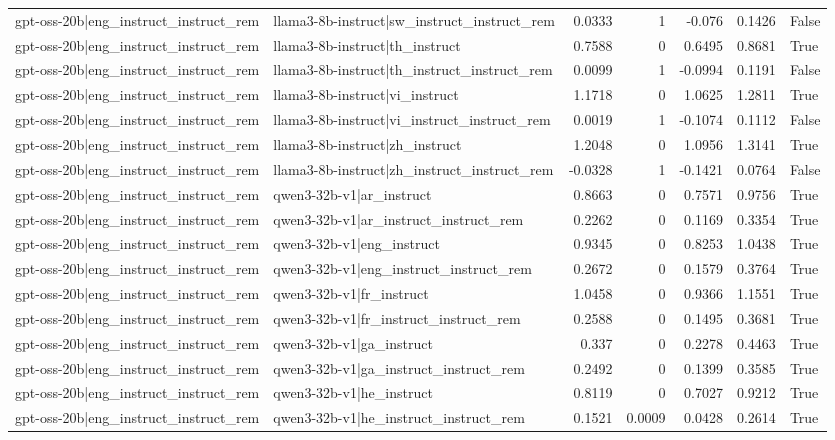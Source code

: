 \begin{table}
\begin{tabular}{l l r r r r l}
gpt-oss-20b|eng_instruct_instruct_rem & llama3-8b-instruct|sw_instruct_instruct_rem & 0.0333 & 1 & -0.076 & 0.1426 & False \\
gpt-oss-20b|eng_instruct_instruct_rem & llama3-8b-instruct|th_instruct & 0.7588 & 0 & 0.6495 & 0.8681 & True \\
gpt-oss-20b|eng_instruct_instruct_rem & llama3-8b-instruct|th_instruct_instruct_rem & 0.0099 & 1 & -0.0994 & 0.1191 & False \\
gpt-oss-20b|eng_instruct_instruct_rem & llama3-8b-instruct|vi_instruct & 1.1718 & 0 & 1.0625 & 1.2811 & True \\
gpt-oss-20b|eng_instruct_instruct_rem & llama3-8b-instruct|vi_instruct_instruct_rem & 0.0019 & 1 & -0.1074 & 0.1112 & False \\
gpt-oss-20b|eng_instruct_instruct_rem & llama3-8b-instruct|zh_instruct & 1.2048 & 0 & 1.0956 & 1.3141 & True \\
gpt-oss-20b|eng_instruct_instruct_rem & llama3-8b-instruct|zh_instruct_instruct_rem & -0.0328 & 1 & -0.1421 & 0.0764 & False \\
gpt-oss-20b|eng_instruct_instruct_rem & qwen3-32b-v1|ar_instruct & 0.8663 & 0 & 0.7571 & 0.9756 & True \\
gpt-oss-20b|eng_instruct_instruct_rem & qwen3-32b-v1|ar_instruct_instruct_rem & 0.2262 & 0 & 0.1169 & 0.3354 & True \\
gpt-oss-20b|eng_instruct_instruct_rem & qwen3-32b-v1|eng_instruct & 0.9345 & 0 & 0.8253 & 1.0438 & True \\
gpt-oss-20b|eng_instruct_instruct_rem & qwen3-32b-v1|eng_instruct_instruct_rem & 0.2672 & 0 & 0.1579 & 0.3764 & True \\
gpt-oss-20b|eng_instruct_instruct_rem & qwen3-32b-v1|fr_instruct & 1.0458 & 0 & 0.9366 & 1.1551 & True \\
gpt-oss-20b|eng_instruct_instruct_rem & qwen3-32b-v1|fr_instruct_instruct_rem & 0.2588 & 0 & 0.1495 & 0.3681 & True \\
gpt-oss-20b|eng_instruct_instruct_rem & qwen3-32b-v1|ga_instruct & 0.337 & 0 & 0.2278 & 0.4463 & True \\
gpt-oss-20b|eng_instruct_instruct_rem & qwen3-32b-v1|ga_instruct_instruct_rem & 0.2492 & 0 & 0.1399 & 0.3585 & True \\
gpt-oss-20b|eng_instruct_instruct_rem & qwen3-32b-v1|he_instruct & 0.8119 & 0 & 0.7027 & 0.9212 & True \\
gpt-oss-20b|eng_instruct_instruct_rem & qwen3-32b-v1|he_instruct_instruct_rem & 0.1521 & 0.0009 & 0.0428 & 0.2614 & True \\

\end{tabular}
\end{table}
